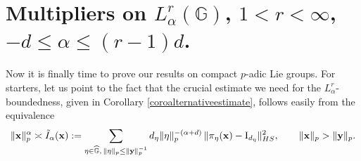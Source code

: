 \documentclass[12pt, reqno]{amsart}
\newcommand{\1}{\mathds{1}}
\newcommand{\G}{\mathbb{G}}
\begin{document}
\section{Multipliers on $L^r_\alpha (\G)$, $1<r<\infty$, $-d \leq \alpha \leq (r-1)d$.}
Now it is finally time to prove our results on compact $p$-adic Lie groups. For starters, let us point to the fact that the crucial estimate we need for the $L^r_\alpha$-boundedness, given in Corollary \ref{coroalternativeestimate}, follows easily from the equivalence
\begin{equation}\label{eqequimultiplier}
    \|\mathbf{x}\|_p^\alpha
 \asymp
\Tilde{I}_\alpha(\mathbf{x})
:=
\sum_{\eta \in \widehat{\G},\,
\|\eta\|_p \le \|\mathbf{y}\|_p^{-1}}
d_\eta 
\|\eta\|_p^{-(\alpha+d)}
\,
\|\pi_\eta(\mathbf{x})-\mathrm{I}_{d_\eta}\|_{HS}^2,
\qquad
\|\mathbf{x}\|_p > \|\mathbf{y}\|_p.
\end{equation}
\end{document}
